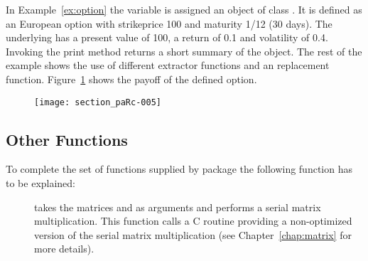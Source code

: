 In Example~\ref{ex:option} the variable  is assigned an
object of class . It is defined as an European option
with strikeprice 100 and maturity 1/12 (30 days). The underlying has a
present value of 100, a return of 0.1 and volatility of 0.4. Invoking the print
method returns a short summary of the object. The rest
of the example shows the use of different extractor functions and an
replacement function. Figure~\ref{fig:payoff} shows the payoff of the
defined option.

\begin{figure}[t]
\centering
\texttt{[image: section\_paRc-005]}
\label{fig:payoff} 
\end{figure}

\subsection{Other Functions}

To complete the set of functions supplied by package  the
following function has to be explained:

\begin{description}
\item[] takes the matrices  and
   as arguments and performs a serial matrix
  multiplication. This function calls a C routine providing a
  non-optimized version of the serial matrix multiplication (see
  Chapter~\ref{chap:matrix} for more details).  
\end{description}
